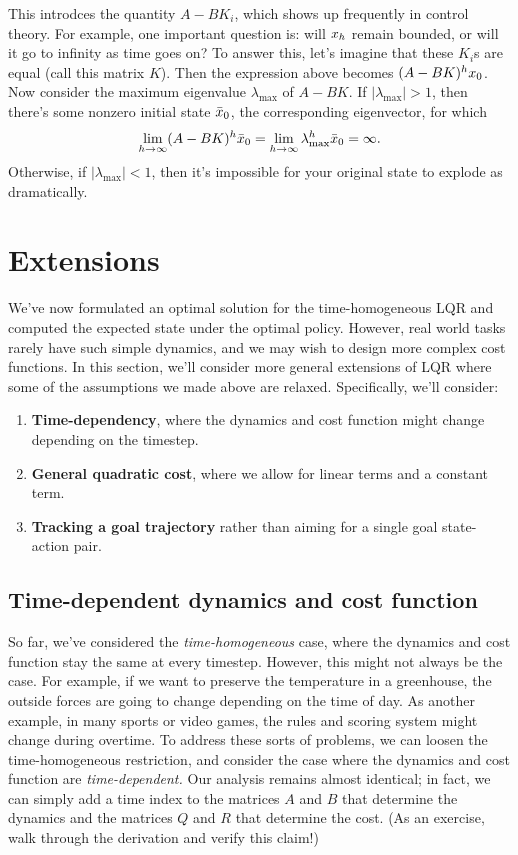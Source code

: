 \documentclass[\main/main]{subfiles}
\begin{document}
This introdces the quantity $A - B K_i$, which shows up frequently in control theory.
For example, one important question is: will $x_h$ remain bounded,
or will it go to infinity as time goes on?
To answer this, let's imagine that these $K_i$s are equal (call this matrix $K$).
Then the expression above becomes $(A-BK)^h x_0$.
Now consider the maximum eigenvalue $\lambda_{\max}$ of $A - BK$.
If $|\lambda_{\max}| > 1$, then there's some nonzero initial state $\bar {x}_0$, the corresponding eigenvector, for which \[
    \lim_{h \to \infty} (A - BK)^h \bar {x}_0
    = \lim_{h \to \infty} \lambda_{\max}^h \bar {x}_0
    = \infty.
\]
Otherwise, if $|\lambda_{\max}| < 1$, then it's impossible for your original state to explode as dramatically.

\section{Extensions}

We've now formulated an optimal solution for the time-homogeneous LQR
and computed the expected state under the optimal policy.
However, real world tasks rarely have such simple dynamics, and we may wish to design more complex cost functions.
In this section, we'll consider more general extensions of LQR where some of the assumptions we made above are relaxed.
Specifically, we'll consider:
\begin{enumerate}
    \item \textbf{Time-dependency}, where the dynamics and cost function might change depending on the timestep.
    \item \textbf{General quadratic cost}, where we allow for linear terms and a constant term.
    \item \textbf{Tracking a goal trajectory} rather than aiming for a single goal state-action pair.
\end{enumerate}

\subsection[Time-dependency]{Time-dependent dynamics and cost function} \label{sec:time_dep_lqr}

So far, we've considered the \emph{time-homogeneous} case,
where the dynamics and cost function stay the same at every timestep.
However, this might not always be the case.
For example, if we want to preserve the temperature in a greenhouse, the outside forces are going to change depending on the time of day.
As another example, in many sports or video games, the rules and scoring system might change during overtime.
To address these sorts of problems, we can loosen the time-homogeneous restriction, and consider the case where the dynamics and cost function are \emph{time-dependent.}
Our analysis remains almost identical; in fact, we can simply add a time index to the matrices $A$ and $B$ that determine the dynamics and the matrices $Q$ and $R$ that determine the cost. (As an exercise, walk through the derivation and verify this claim!)
\end{document}

